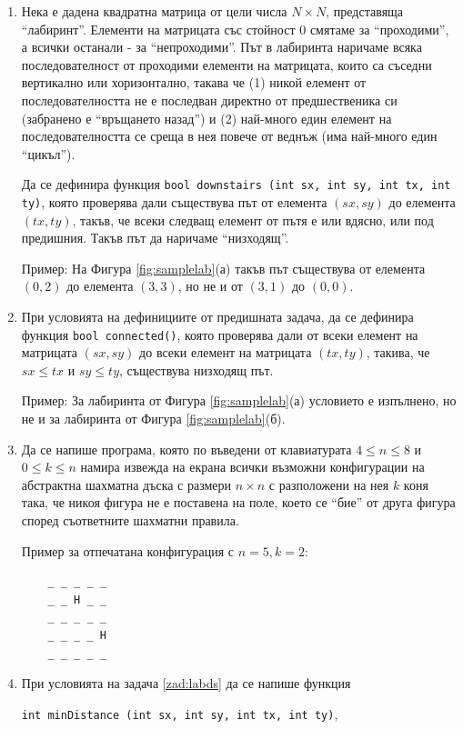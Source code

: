 {\begin{enumerate}[resume]
	\item \label{zad:labds} Нека е дадена квадратна матрица от цели числа $N \times N$, представяща ``лабиринт''. Елементи на матрицата със стойност $0$ смятаме за ``проходими'', а всички останали - за ``непроходими''. Път в лабиринта наричаме всяка последователност от проходими елементи на матрицата, които са съседни вертикално или хоризонтално, такава че (1) никой елемент от последователността не е последван директно от предшественика си (забранено е ``връщането назад'') и (2) най-много един елемент на последователността се среща в нея повече от веднъж (има най-много един ``цикъл'').

	Да се дефинира функция \texttt{bool downstairs (int sx, int sy, int tx, int ty)}, която проверява дали съществува път от елемента $(sx,sy)$ до елемента $(tx,ty)$, такъв, че всеки следващ елемент от пътя е или вдясно, или под предишния. Такъв път да наричаме ``низходящ''.

	Пример: На Фигура \ref{fig:samplelab}(а) такъв път съществува от елемента $(0,2)$ до елемента $(3,3)$, но не и от $(3,1)$ до $(0,0)$.

	\item При условията на дефинициите от предишната задача, да се дефинира функция \texttt{bool connected()}, която проверява дали от всеки елемент на матрицата $(sx,sy)$ до всеки елемент на матрицата  $(tx,ty)$, такива, че $sx \leq tx$ и $sy \leq ty$, съществува низходящ път.

	Пример: За лабиринта от Фигура \ref{fig:samplelab}(а) условието е изпълнено, но не и за лабиринта от Фигура \ref{fig:samplelab}(б).


	\item Да се напише програма, която по въведени от клавиатурата $4 \le n \le 8$ и $0 \le k \le n$ намира извежда на екрана всички възможни конфигурации на абстрактна шахматна дъска с размери $n \times n$ с разположени на нея $k$ коня така, че никоя фигура не е поставена на поле, което се ``бие'' от друга фигура според съответните шахматни правила.

	Пример за отпечатана конфигурация с $n=5, k=2$:
	\begin{verbatim}
	_ _ _ _ _
	_ _ H _ _
	_ _ _ _ _
	_ _ _ _ H
	_ _ _ _ _

	\end{verbatim}


	\item При условията на задача \ref{zad:labds} да се напише функция

	\texttt{int minDistance (int sx, int sy, int tx, int ty)},


\end{enumerate}}
